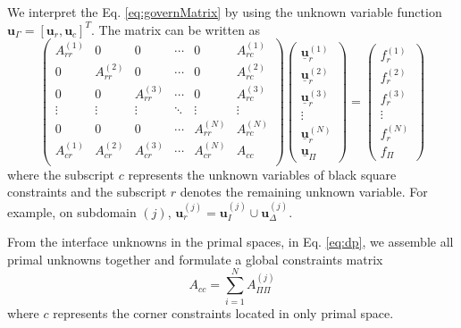 We interpret the Eq. \eqref{eq:governMatrix} by using the unknown variable function $ \mathbf{u}_{\Gamma} = [\mathbf{u}_{r}, \mathbf{u}_{c}]^{T} $. The matrix can be written as
\begin{equation}\label{eq:globalMatrix}
\begin{pmatrix}
A_{rr}^{(1)} & 0 & 0 & \cdots & 0 & A_{rc}^{(1)}\\
0 & A_{rr}^{(2)} & 0 & \cdots & 0 & A_{rc}^{(2)} \\
0 & 0 & A_{rr}^{(3)} & \cdots & 0 & A_{rc}^{(3)} \\
\vdots & \vdots & \vdots & \ddots & \vdots & \vdots \\
0 & 0 & 0 & \cdots & A_{rr}^{(N)} & A_{rc}^{(N)}\\
A_{cr}^{(1)} & A_{cr}^{(2)} & A_{cr}^{(3)} & \cdots & {A_{cr}^{(N)}} & A_{cc} \\
\end{pmatrix} 
\begin{pmatrix}
\underline{\mathbf{u}}_{r}^{(1)} \\ \underline{\mathbf{u}}_{r}^{(2)}  \\ \underline{\mathbf{u}}_{r}^{(3)} \\ \vdots \\ \underline{\mathbf{u}}_{r}^{(N)}  \\ \underline{\mathbf{u}}_{\Pi}
\end{pmatrix} =
\begin{pmatrix}
f_{r}^{(1)} \\ f_{r}^{(2)}  \\ f_{r}^{(3)} \\ \vdots \\ f_{r}^{(N)}  \\ f_{\Pi}
\end{pmatrix}
\end{equation}
where the subscript $ c $ represents the unknown variables of black square constraints and the subscript $ r $ denotes the remaining unknown variable. For example, on subdomain $ (j) $, $ \mathbf{u}_{r}^{(j)} = \mathbf{u}_{I}^{(j)} \cup \mathbf{u}_{\Delta}^{(j)} $.

From the interface unknowns in the primal spaces, in Eq. \eqref{eq:dp}, we assemble all primal unknowns together and formulate a global constraints matrix
\begin{equation}
A_{cc} = \sum_{i=1}^{N} A_{\Pi \Pi}^{(j)}
\end{equation}
where $ c $ represents the corner constraints located in only primal space. 

